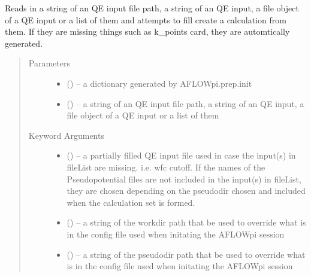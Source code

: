 \documentclass[letterpaper,10pt,english]{sphinxmanual}
\begin{document}
\begin{fulllineitems}
\label{\detokenize{prep:prep.calcFromFile}}
Reads in a string of an QE input file path, a string of an QE input, a file object of a
QE input or a list of them and attempts to fill create a calculation from them. If they
are missing things such as k\_points card, they are automtically generated.
\begin{quote}\begin{description}
\item[{Parameters}] \leavevmode\begin{itemize}
\item {} 
 () -- a dictionary generated by AFLOWpi.prep.init

\item {} 
 () -- a string of an QE input file path, a string of an QE input, a file
object of a QE input or a list of them

\end{itemize}

\item[{Keyword Arguments}] \leavevmode\begin{itemize}
\item {} 
 () -- a partially filled QE input file used in case the input(s) in fileList
are missing. i.e. wfc cutoff. If the names of the Pseudopotential files
are not included in the input(s) in fileList, they are chosen depending
on the pseudodir chosen and included when the calculation set is formed.

\item {} 
 () -- a string of the workdir path that be used to override what is in the
config file used when initating the AFLOWpi session

\item {} 
 () -- a string of the pseudodir path that be used to override what is in
the config file used when initating the AFLOWpi session

\end{itemize}

\end{description}\end{quote}

\end{fulllineitems}
\end{document}
